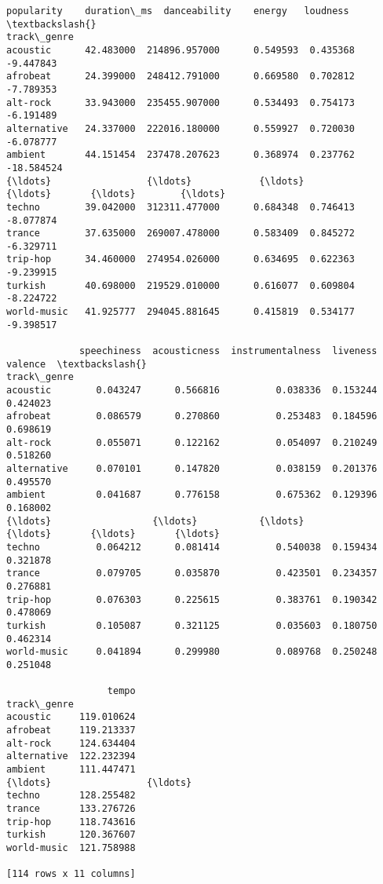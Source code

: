 \documentclass[11pt]{article}
\makeatletter
\newcommand{\boxspacing}{\kern\kvtcb@left@rule\kern\kvtcb@boxsep}
\newcommand{\prompt}[4]{
        {\ttfamily\llap{{\color{#2}[#3]:\hspace{3pt}#4}}\vspace{-\baselineskip}}
    }
\makeatother
\begin{document}
            \begin{tcolorbox}[breakable, size=fbox, boxrule=.5pt, pad at break*=1mm, opacityfill=0]
\prompt{Out}{outcolor}{76}{\boxspacing}
\begin{Verbatim}[commandchars=\\\{\}]
             popularity    duration\_ms  danceability    energy   loudness  \textbackslash{}
track\_genre
acoustic      42.483000  214896.957000      0.549593  0.435368  -9.447843
afrobeat      24.399000  248412.791000      0.669580  0.702812  -7.789353
alt-rock      33.943000  235455.907000      0.534493  0.754173  -6.191489
alternative   24.337000  222016.180000      0.559927  0.720030  -6.078777
ambient       44.151454  237478.207623      0.368974  0.237762 -18.584524
{\ldots}                 {\ldots}            {\ldots}           {\ldots}       {\ldots}        {\ldots}
techno        39.042000  312311.477000      0.684348  0.746413  -8.077874
trance        37.635000  269007.478000      0.583409  0.845272  -6.329711
trip-hop      34.460000  274954.026000      0.634695  0.622363  -9.239915
turkish       40.698000  219529.010000      0.616077  0.609804  -8.224722
world-music   41.925777  294045.881645      0.415819  0.534177  -9.398517

             speechiness  acousticness  instrumentalness  liveness   valence  \textbackslash{}
track\_genre
acoustic        0.043247      0.566816          0.038336  0.153244  0.424023
afrobeat        0.086579      0.270860          0.253483  0.184596  0.698619
alt-rock        0.055071      0.122162          0.054097  0.210249  0.518260
alternative     0.070101      0.147820          0.038159  0.201376  0.495570
ambient         0.041687      0.776158          0.675362  0.129396  0.168002
{\ldots}                  {\ldots}           {\ldots}               {\ldots}       {\ldots}       {\ldots}
techno          0.064212      0.081414          0.540038  0.159434  0.321878
trance          0.079705      0.035870          0.423501  0.234357  0.276881
trip-hop        0.076303      0.225615          0.383761  0.190342  0.478069
turkish         0.105087      0.321125          0.035603  0.180750  0.462314
world-music     0.041894      0.299980          0.089768  0.250248  0.251048

                  tempo
track\_genre
acoustic     119.010624
afrobeat     119.213337
alt-rock     124.634404
alternative  122.232394
ambient      111.447471
{\ldots}                 {\ldots}
techno       128.255482
trance       133.276726
trip-hop     118.743616
turkish      120.367607
world-music  121.758988

[114 rows x 11 columns]
\end{Verbatim}
\end{tcolorbox}
        
\end{document}
